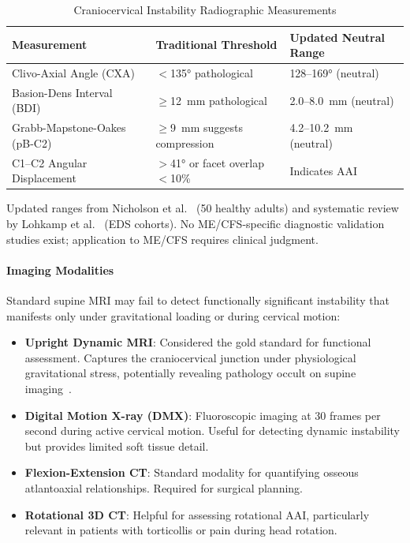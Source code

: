 \begin{table}[htbp]
\centering
\caption{Craniocervical Instability Radiographic Measurements}
\label{tab:cci-measurements}
\begin{tabular}{@{}lll@{}}
\toprule
\textbf{Measurement} & \textbf{Traditional Threshold} & \textbf{Updated Neutral Range} \\
\midrule
Clivo-Axial Angle (CXA) & $<$135° pathological & 128--169° (neutral) \\
Basion-Dens Interval (BDI) & $\geq$12~mm pathological & 2.0--8.0~mm (neutral) \\
Grabb-Mapstone-Oakes (pB-C2) & $\geq$9~mm suggests compression & 4.2--10.2~mm (neutral) \\
C1--C2 Angular Displacement & $>$41° or facet overlap $<$10\% & Indicates AAI \\
\bottomrule
\end{tabular}
\par\smallskip
\footnotesize{Updated ranges from Nicholson et al.~\cite{Nicholson2023} (50 healthy adults) and systematic review by Lohkamp et al.~\cite{Lohkamp2022} (EDS cohorts). No ME/CFS-specific diagnostic validation studies exist; application to ME/CFS requires clinical judgment.}
\end{table}

\paragraph{Imaging Modalities}

Standard supine MRI may fail to detect functionally significant instability that manifests only under gravitational loading or during cervical motion:

\begin{itemize}
    \item \textbf{Upright Dynamic MRI}: Considered the gold standard for functional assessment. Captures the craniocervical junction under physiological gravitational stress, potentially revealing pathology occult on supine imaging~\cite{Klinge2021}.
    \item \textbf{Digital Motion X-ray (DMX)}: Fluoroscopic imaging at 30 frames per second during active cervical motion. Useful for detecting dynamic instability but provides limited soft tissue detail.
    \item \textbf{Flexion-Extension CT}: Standard modality for quantifying osseous atlantoaxial relationships. Required for surgical planning.
    \item \textbf{Rotational 3D CT}: Helpful for assessing rotational AAI, particularly relevant in patients with torticollis or pain during head rotation.
\end{itemize}

